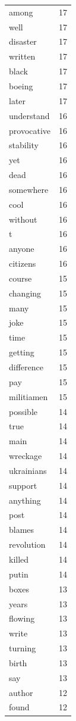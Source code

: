 \begin{tabular}{lr}
among & 17 \\
well & 17 \\
disaster & 17 \\
written & 17 \\
black & 17 \\
boeing & 17 \\
later & 17 \\
understand & 16 \\
provocative & 16 \\
stability & 16 \\
yet & 16 \\
dead & 16 \\
somewhere & 16 \\
cool & 16 \\
without & 16 \\
t & 16 \\
anyone & 16 \\
citizens & 16 \\
course & 15 \\
changing & 15 \\
many & 15 \\
joke & 15 \\
time & 15 \\
getting & 15 \\
difference & 15 \\
pay & 15 \\
militiamen & 15 \\
possible & 14 \\
true & 14 \\
main & 14 \\
wreckage & 14 \\
ukrainians & 14 \\
support & 14 \\
anything & 14 \\
post & 14 \\
blames & 14 \\
revolution & 14 \\
killed & 14 \\
putin & 14 \\
boxes & 13 \\
years & 13 \\
flowing & 13 \\
write & 13 \\
turning & 13 \\
birth & 13 \\
say & 13 \\
author & 12 \\
found & 12 \\

\end{tabular}
